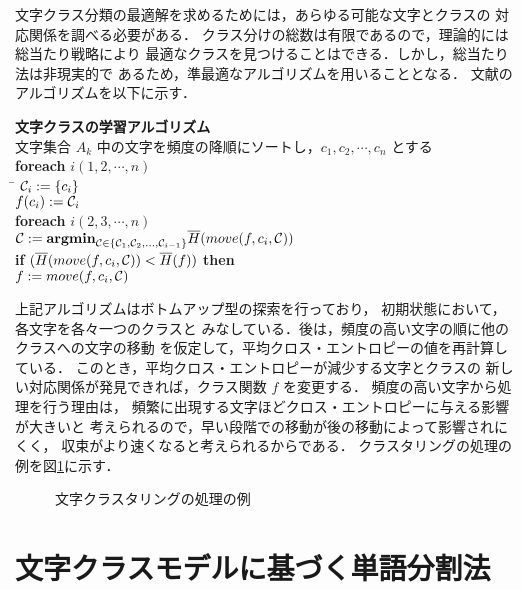 文字クラス分類の最適解を求めるためには，あらゆる可能な文字とクラスの
対応関係を調べる必要がある．
クラス分けの総数は有限であるので，理論的には総当たり戦略により
最適なクラスを見つけることはできる．しかし，総当たり法は非現実的で
あるため，準最適なアルゴリズムを用いることとなる．
文献\cite{Mori97}のアルゴリズムを以下に示す．
\vspace{3mm}
\begin{tabbing}
{\bf 文字クラスの学習アルゴリズム}\\
{文字集合 $A_k$ 中の文字を頻度の降順にソートし，$c_1, c_2, \cdots, c_n$ とする}\\
{\bf foreach} {$i  (1, 2, \cdots, n)$}\\
\hspace*{2ex} \= ${\cal C}_i := \{c_i\}$\\
\> $f(c_i) := {\cal C}_i$\\
{\bf foreach} {$i  (2, 3, \cdots, n)$} \+ \\
${\cal C} := {\bf argmin}_{{\cal C} \in \{{\cal C}_1, {\cal C}_2, ..., {\cal C}_{i-1}\}} \overline{H}(move(f, c_i, {\cal C}))$\\
{\bf if} $(\overline{H}(move(f, c_i, {\cal C})) < \overline{H}(f))$ {\bf then} \\
\hspace{2ex} $f := move(f, c_i, {\cal C})$  \-
\end{tabbing}
\vspace{3mm}
上記アルゴリズムはボトムアップ型の探索を行っており，
初期状態において，各文字を各々一つのクラスと
みなしている．後は，頻度の高い文字の順に他のクラスへの文字の移動
を仮定して，平均クロス・エントロピーの値を再計算している．
このとき，平均クロス・エントロピーが減少する文字とクラスの
新しい対応関係が発見できれば，クラス関数 $f$ を変更する．
頻度の高い文字から処理を行う理由は，
頻繁に出現する文字ほどクロス・エントロピーに与える影響が大きいと
考えられるので，早い段階での移動が後の移動によって影響されにくく，
収束がより速くなると考えられるからである．
クラスタリングの処理の例を図\ref{Fig:ClusteringImage}に示す．
\begin{figure}[hbt]
\begin{center}
\end{center}
\caption{文字クラスタリングの処理の例}
\label{Fig:ClusteringImage}
\end{figure}

\section{文字クラスモデルに基づく単語分割法}
\vspace{-1mm}

